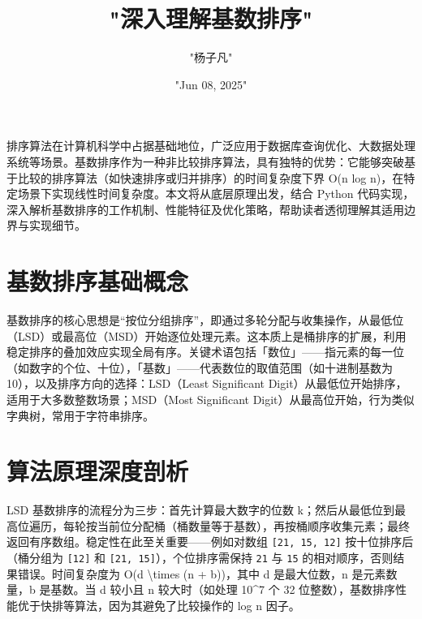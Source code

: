 \title{"深入理解基数排序"}
\author{"杨子凡"}
\date{"Jun 08, 2025"}
\maketitle
排序算法在计算机科学中占据基础地位，广泛应用于数据库查询优化、大数据处理系统等场景。基数排序作为一种非比较排序算法，具有独特的优势：它能够突破基于比较的排序算法（如快速排序或归并排序）的时间复杂度下界 O(n log n)，在特定场景下实现线性时间复杂度。本文将从底层原理出发，结合 Python 代码实现，深入解析基数排序的工作机制、性能特征及优化策略，帮助读者透彻理解其适用边界与实现细节。\par
\chapter{基数排序基础概念}
基数排序的核心思想是“按位分组排序”，即通过多轮分配与收集操作，从最低位（LSD）或最高位（MSD）开始逐位处理元素。这本质上是桶排序的扩展，利用稳定排序的叠加效应实现全局有序。关键术语包括「数位」——指元素的每一位（如数字的个位、十位），「基数」——代表数位的取值范围（如十进制基数为 10），以及排序方向的选择：LSD（Least Significant Digit）从最低位开始排序，适用于大多数整数场景；MSD（Most Significant Digit）从最高位开始，行为类似字典树，常用于字符串排序。\par
\chapter{算法原理深度剖析}
LSD 基数排序的流程分为三步：首先计算最大数字的位数 k；然后从最低位到最高位遍历，每轮按当前位分配桶（桶数量等于基数），再按桶顺序收集元素；最终返回有序数组。稳定性在此至关重要——例如对数组 \texttt{[21, 15, 12]} 按十位排序后（桶分组为 \texttt{[12]} 和 \texttt{[21, 15]}），个位排序需保持 \texttt{21} 与 \texttt{15} 的相对顺序，否则结果错误。时间复杂度为 O(d \textbackslash{}times (n + b))，其中 d 是最大位数，n 是元素数量，b 是基数。当 d 较小且 n 较大时（如处理 10\^{}7 个 32 位整数），基数排序性能优于快排等算法，因为其避免了比较操作的 log n 因子。\par
